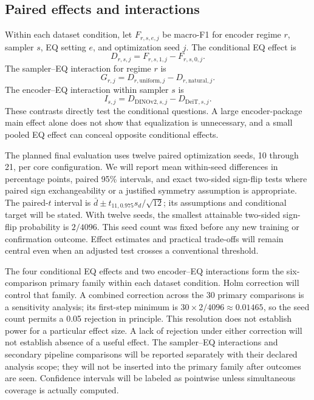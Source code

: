 \documentclass[conference]{IEEEtran}
\begin{document}
\subsection{Paired effects and interactions}
Within each dataset condition, let $F_{r,s,e,j}$ be macro-F1 for encoder regime $r$, sampler $s$, EQ setting $e$, and optimization seed $j$. The conditional EQ effect is
\begin{equation}
D_{r,s,j}=F_{r,s,1,j}-F_{r,s,0,j}.
\end{equation}
The sampler--EQ interaction for regime $r$ is
\begin{equation}
G_{r,j}=D_{r,\mathrm{uniform},j}-D_{r,\mathrm{natural},j}.
\end{equation}
The encoder--EQ interaction within sampler $s$ is
\begin{equation}
I_{s,j}=D_{\mathrm{DINOv2},s,j}-D_{\mathrm{DeiT},s,j}.
\end{equation}
These contrasts directly test the conditional questions. A large encoder-package main effect alone does not show that equalization is unnecessary, and a small pooled EQ effect can conceal opposite conditional effects.

The planned final evaluation uses twelve paired optimization seeds, 10 through 21, per core configuration. We will report mean within-seed differences in percentage points, paired 95\% intervals, and exact two-sided sign-flip tests where paired sign exchangeability or a justified symmetry assumption is appropriate. The paired-$t$ interval is $\bar d\pm t_{11,0.975}s_d/\sqrt{12}$; its assumptions and conditional target will be stated. With twelve seeds, the smallest attainable two-sided sign-flip probability is $2/4096$. This seed count was fixed before any new training or confirmation outcome. Effect estimates and practical trade-offs will remain central even when an adjusted test crosses a conventional threshold.

The four conditional EQ effects and two encoder--EQ interactions form the six-comparison primary family within each dataset condition. Holm correction \cite{holm1979} will control that family. A combined correction across the 30 primary comparisons is a sensitivity analysis; its first-step minimum is $30\times2/4096\approx0.01465$, so the seed count permits a 0.05 rejection in principle. This resolution does not establish power for a particular effect size. A lack of rejection under either correction will not establish absence of a useful effect. The sampler--EQ interactions and secondary pipeline comparisons will be reported separately with their declared analysis scope; they will not be inserted into the primary family after outcomes are seen. Confidence intervals will be labeled as pointwise unless simultaneous coverage is actually computed.
\end{document}
